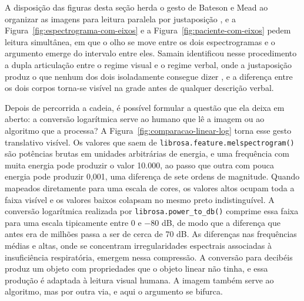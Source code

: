A disposição das figuras desta seção herda o gesto de Bateson e Mead ao organizar as imagens para leitura paralela por justaposição \parencite{BatesonMead1942}, e a Figura~\ref{fig:espectrograma-com-eixos} e a Figura~\ref{fig:paciente-com-eixos} pedem leitura simultânea, em que o olho se move entre os dois espectrogramas e o argumento emerge do intervalo entre eles. Samain identificou nesse procedimento a dupla articulação entre o regime visual e o regime verbal, onde a justaposição produz o que nenhum dos dois isoladamente consegue dizer \parencite{Samain2000Balinese}, e a diferença entre os dois corpos torna-se visível na grade antes de qualquer descrição verbal.

Depois de percorrida a cadeia, é possível formular a questão que ela deixa em aberto: a conversão logarítmica serve ao humano que lê a imagem ou ao algoritmo que a processa? A Figura~\ref{fig:comparacao-linear-log} torna esse gesto translativo visível. Os valores que saem de \texttt{librosa.feature.melspectrogram()} são potências brutas em unidades arbitrárias de energia, e uma frequência com muita energia pode produzir o valor 10.000, ao passo que outra com pouca energia pode produzir 0,001, uma diferença de sete ordens de magnitude. Quando mapeados diretamente para uma escala de cores, os valores altos ocupam toda a faixa visível e os valores baixos colapsam no mesmo preto indistinguível. A conversão logarítmica realizada por \texttt{librosa.power\_to\_db()} comprime essa faixa para uma escala tipicamente entre 0 e $-80$ dB, de modo que a diferença que antes era de milhões passa a ser de cerca de 70 dB. As diferenças nas frequências médias e altas, onde se concentram irregularidades espectrais associadas à insuficiência respiratória, emergem nessa compressão. A conversão para decibéis produz um objeto com propriedades que o objeto linear não tinha, e essa produção é adaptada à leitura visual humana. A imagem também serve ao algoritmo, mas por outra via, e aqui o argumento se bifurca.

